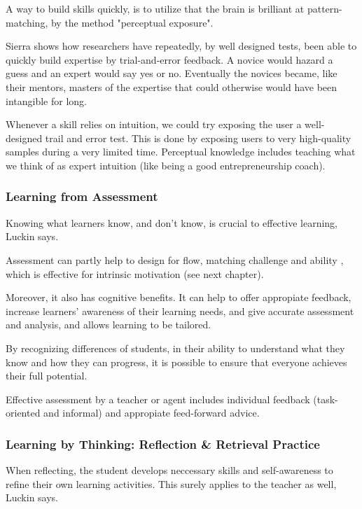   A way to build skills quickly, is to utilize that the brain is brilliant at pattern-matching, by the method "perceptual exposure". \cite{sierra}

  Sierra shows how researchers have repeatedly, by well designed tests, been able to quickly build expertise by trial-and-error feedback. A novice would hazard a guess and an expert would say yes or no. Eventually the novices became, like their mentors, masters of the expertise that could otherwise would have been intangible for long.

  Whenever a skill relies on intuition, we could try exposing the user a well-designed trail and error test. This is done by exposing users to very high-quality samples during a very limited time. Perceptual knowledge includes teaching what we think of as expert intuition (like being a good entrepreneurship coach).

  \subsubsection{Learning from Assessment}

  Knowing what learners know, and don't know, is crucial to effective learning, Luckin \cite{luckin} says.

  Assessment can partly help to design for flow, matching challenge and ability \cite{bruhlmann}, which is effective for intrinsic motivation (see next chapter).

  Moreover, it also has cognitive benefits. It can help to offer appropiate feedback, increase learners' awareness of their learning needs, and give accurate assessment and analysis, and allows learning to be tailored.

  By recognizing differences of students, in their ability to understand what they know and how they can progress, it is possible to ensure that everyone achieves their full potential.

  Effective assessment by a teacher or agent includes individual feedback (task-oriented and informal) and appropiate feed-forward advice.

  \subsubsection{Learning by Thinking: Reflection \& Retrieval Practice}

  When reflecting, the student develops neccessary skills and self-awareness to refine their own learning activities. This surely applies to the teacher as well, Luckin says. \cite{luckin}

